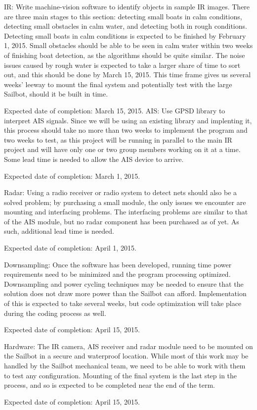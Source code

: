 IR:
Write machine-vision software to identify objects in sample IR images. There are three main stages to this section: detecting small boats in calm conditions, detecting small obstacles in calm water, and detecting both in rough conditions. Detecting small boats in calm conditions is expected to be finished by February 1, 2015. Small obstacles should be able to be seen in calm water within two weeks of finishing boat detection, as the algorithms should be quite similar. The noise issues caused by rough water is expected to take a larger share of time to sort out, and this should be done by March 15, 2015. This time frame gives us several weeks' leeway to mount the final system and potentially test with the large Sailbot, should it be built in time.

Expected date of completion: March 15, 2015. \newline\newline
AIS:
Use GPSD library to interpret AIS signals. Since we will be using an existing library and implenting it, this process should take no more than two weeks to implement the program and two weeks to test, as this project will be running in parallel to the main IR project and will have only one or two group members working on it at a time. Some lead time is needed to allow the AIS device to arrive.

Expected date of completion: March 1, 2015.\newline


Radar:
Using a radio receiver or radio system to detect nets should also be a solved problem; by purchasing a small module, the only issues we encounter are mounting and interfacing problems. The interfacing problems are similar to that of the AIS module, but no radar component has been purchased as of yet. As such, additional lead time is needed.

Expected date of completion: April 1, 2015.\newline


Downsampling:
Once the software has been developed, running time power requirements need to be minimized and the program processing optimized. Downsampling and power cycling techniques may be needed to ensure that the solution does not draw more power than the Sailbot can afford. Implementation of this is expected to take several weeks, but code optimization will take place during the coding process as well.

Expected date of completion: April 15, 2015.\newline


Hardware:
The IR camera, AIS receiver and radar module need to be mounted on the Sailbot in a secure and waterproof location. While most of this work may be handled by the Sailbot mechanical team, we need to be able to work with them to test any configuration. Mounting of the final system is the last step in the process, and so is expected to be completed near the end of the term.

Expected date of completion: April 15, 2015.\newline

